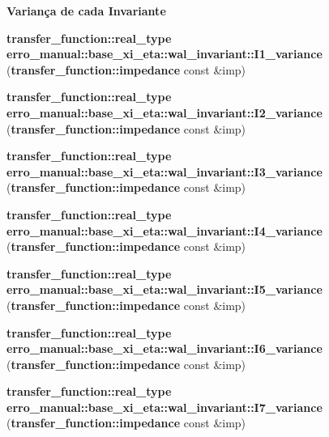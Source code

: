 \begin{Indent}{\bf Variança de cada Invariante}\par
\begin{CompactItemize}
\item 
{\bf transfer\_\-function::real\_\-type} \textbf{erro\_\-manual::base\_\-xi\_\-eta::wal\_\-invariant::I1\_\-variance} ({\bf transfer\_\-function::impedance} const \&imp)\label{namespaceerro__manual_1_1base__xi__eta_1_1wal__invariant_80b89b5e41b150b9b18e3df33af35fdd}

\item 
{\bf transfer\_\-function::real\_\-type} \textbf{erro\_\-manual::base\_\-xi\_\-eta::wal\_\-invariant::I2\_\-variance} ({\bf transfer\_\-function::impedance} const \&imp)\label{namespaceerro__manual_1_1base__xi__eta_1_1wal__invariant_afbc5c1205bfae59e3ac61e02d159c65}

\item 
{\bf transfer\_\-function::real\_\-type} \textbf{erro\_\-manual::base\_\-xi\_\-eta::wal\_\-invariant::I3\_\-variance} ({\bf transfer\_\-function::impedance} const \&imp)\label{namespaceerro__manual_1_1base__xi__eta_1_1wal__invariant_6205ce9bcce986d1c6da3b1706ced303}

\item 
{\bf transfer\_\-function::real\_\-type} \textbf{erro\_\-manual::base\_\-xi\_\-eta::wal\_\-invariant::I4\_\-variance} ({\bf transfer\_\-function::impedance} const \&imp)\label{namespaceerro__manual_1_1base__xi__eta_1_1wal__invariant_0b5049bdf8fbe8d01d1bfd63d6e850b6}

\item 
{\bf transfer\_\-function::real\_\-type} \textbf{erro\_\-manual::base\_\-xi\_\-eta::wal\_\-invariant::I5\_\-variance} ({\bf transfer\_\-function::impedance} const \&imp)\label{namespaceerro__manual_1_1base__xi__eta_1_1wal__invariant_ec20dda7bd10d4c497117876fecc2e90}

\item 
{\bf transfer\_\-function::real\_\-type} \textbf{erro\_\-manual::base\_\-xi\_\-eta::wal\_\-invariant::I6\_\-variance} ({\bf transfer\_\-function::impedance} const \&imp)\label{namespaceerro__manual_1_1base__xi__eta_1_1wal__invariant_243a44890f22b0bca362513d76ca69bf}

\item 
{\bf transfer\_\-function::real\_\-type} \textbf{erro\_\-manual::base\_\-xi\_\-eta::wal\_\-invariant::I7\_\-variance} ({\bf transfer\_\-function::impedance} const \&imp)\label{namespaceerro__manual_1_1base__xi__eta_1_1wal__invariant_70bc41ff4b971e1406bf2cd5597f0459}


\end{CompactItemize}
\end{Indent}

